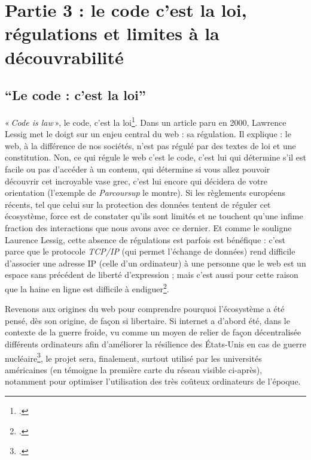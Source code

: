 

\part{Partie 3 : le code c'est la loi, régulations et limites à la découvrabilité}

\chapter*{\enquote{Le code : c'est la loi}}

« \textit{Code is law} », le code, c’est la loi\footcite[(nous avons consulté la version française disponible sur Framablog)]{lessig_code_2000}. Dans un article paru en 2000, Lawrence Lessig met le doigt sur un enjeu central du web : sa régulation. Il explique : le web, à la différence de nos sociétés, n’est pas régulé par des textes de loi et une constitution. Non, ce qui régule le web c’est le code, c’est lui qui détermine s’il est facile ou pas d’accéder à un contenu, qui détermine si vous allez pouvoir découvrir cet incroyable vase grec, c’est lui encore qui décidera de votre orientation (l’exemple de \textit{Parcoursup} le montre). Si les règlements européens récents, tel que celui sur la protection des données tentent de réguler cet écosystème, force est de constater qu’ils sont limités et ne touchent qu’une infime fraction des interactions que nous avons avec ce dernier. Et comme le souligne Laurence Lessig, cette absence de régulations est parfois est bénéfique : c’est parce que le protocole \textit{TCP/IP} (qui permet l’échange de données) rend difficile d’associer une adresse IP (celle d’un ordinateur) à une personne que le web est un espace sans précédent de liberté d’expression ; mais c’est aussi pour cette raison que la haine en ligne est difficile à endiguer\footcite[§8 et § 9]{lessig_code_2000}.

Revenons aux origines du web pour comprendre pourquoi l’écosystème a été pensé, dès son origine, de façon si libertaire. Si internet a d’abord été, dans le contexte de la guerre froide, vu comme un moyen de relier de façon décentralisée différents ordinateurs afin d’améliorer la résilience des États-Unis en cas de guerre nucléaire\footcite{2024i}, le projet sera, finalement, surtout utilisé par les universités américaines (en témoigne la première carte du réseau visible ci-après), notamment pour optimiser l’utilisation des très coûteux ordinateurs de l’époque.
\newpage

